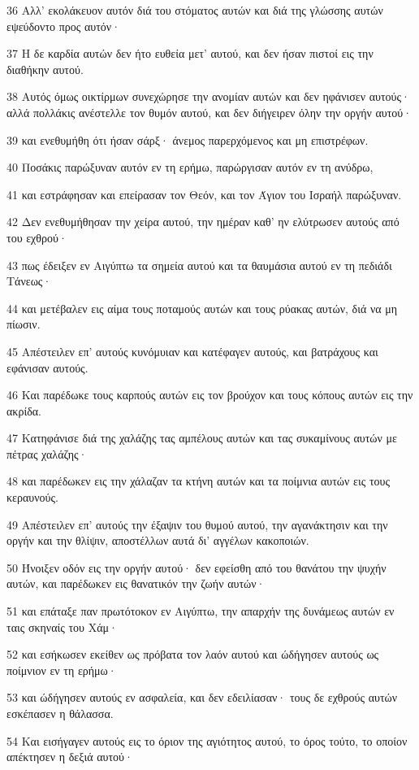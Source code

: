 \par 36 Αλλ' εκολάκευον αυτόν διά του στόματος αυτών και διά της γλώσσης αυτών εψεύδοντο προς αυτόν·
\par 37 Η δε καρδία αυτών δεν ήτο ευθεία μετ' αυτού, και δεν ήσαν πιστοί εις την διαθήκην αυτού.
\par 38 Αυτός όμως οικτίρμων συνεχώρησε την ανομίαν αυτών και δεν ηφάνισεν αυτούς· αλλά πολλάκις ανέστελλε τον θυμόν αυτού, και δεν διήγειρεν όλην την οργήν αυτού·
\par 39 και ενεθυμήθη ότι ήσαν σάρξ· άνεμος παρερχόμενος και μη επιστρέφων.
\par 40 Ποσάκις παρώξυναν αυτόν εν τη ερήμω, παρώργισαν αυτόν εν τη ανύδρω,
\par 41 και εστράφησαν και επείρασαν τον Θεόν, και τον Άγιον του Ισραήλ παρώξυναν.
\par 42 Δεν ενεθυμήθησαν την χείρα αυτού, την ημέραν καθ' ην ελύτρωσεν αυτούς από του εχθρού·
\par 43 πως έδειξεν εν Αιγύπτω τα σημεία αυτού και τα θαυμάσια αυτού εν τη πεδιάδι Τάνεως·
\par 44 και μετέβαλεν εις αίμα τους ποταμούς αυτών και τους ρύακας αυτών, διά να μη πίωσιν.
\par 45 Απέστειλεν επ' αυτούς κυνόμυιαν και κατέφαγεν αυτούς, και βατράχους και εφάνισαν αυτούς.
\par 46 Και παρέδωκε τους καρπούς αυτών εις τον βρούχον και τους κόπους αυτών εις την ακρίδα.
\par 47 Κατηφάνισε διά της χαλάζης τας αμπέλους αυτών και τας συκαμίνους αυτών με πέτρας χαλάζης·
\par 48 και παρέδωκεν εις την χάλαζαν τα κτήνη αυτών και τα ποίμνια αυτών εις τους κεραυνούς.
\par 49 Απέστειλεν επ' αυτούς την έξαψιν του θυμού αυτού, την αγανάκτησιν και την οργήν και την θλίψιν, αποστέλλων αυτά δι' αγγέλων κακοποιών.
\par 50 Ήνοιξεν οδόν εις την οργήν αυτού· δεν εφείσθη από του θανάτου την ψυχήν αυτών, και παρέδωκεν εις θανατικόν την ζωήν αυτών·
\par 51 και επάταξε παν πρωτότοκον εν Αιγύπτω, την απαρχήν της δυνάμεως αυτών εν ταις σκηναίς του Χάμ·
\par 52 και εσήκωσεν εκείθεν ως πρόβατα τον λαόν αυτού και ώδήγησεν αυτούς ως ποίμνιον εν τη ερήμω·
\par 53 και ώδήγησεν αυτούς εν ασφαλεία, και δεν εδειλίασαν· τους δε εχθρούς αυτών εσκέπασεν η θάλασσα.
\par 54 Και εισήγαγεν αυτούς εις το όριον της αγιότητος αυτού, το όρος τούτο, το οποίον απέκτησεν η δεξιά αυτού·
